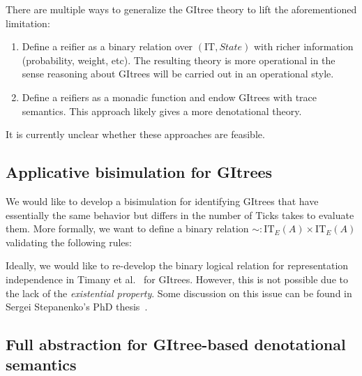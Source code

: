 \documentclass{article}
\theoremstyle{definition}
\theoremstyle{plain}
\theoremstyle{remark}
\newcommand{\IT}{\mathrm{IT}}
\newcommand{\gVis}{\mathrm{Vis}}
\newcommand{\gFun}{\mathrm{Fun}}
\newcommand{\Tick}{\mathrm{Tick}}
\begin{document}
There are multiple ways to generalize the GItree theory to lift the aforementioned limitation:

\begin{enumerate}
  \item Define a reifier as a binary relation over \((\IT,State)\) with richer information (probability, weight, etc).
    The resulting theory is more operational in the sense reasoning about GItrees will be carried out in an operational style.
  \item Define a reifiers as a monadic function and endow GItrees with trace semantics.
    This approach likely gives a more denotational theory.
\end{enumerate}

It is currently unclear whether these approaches are feasible.

\subsection{Applicative bisimulation for GItrees}

We would like to develop a bisimulation for identifying GItrees that have essentially the same behavior but differs in the number of \(\Tick\)s takes to evaluate them.
More formally, we want to define a binary relation \(\sim : \IT_{E}(A) \times \IT_{E}(A)\) validating the following rules:


Ideally, we would like to re-develop the binary logical relation for representation independence in Timany et al.~\cite{jacm-logrel} for GItrees.
However, this is not possible due to the lack of the \emph{existential property}. Some discussion on this issue can be found in Sergei Stepanenko's PhD thesis~\cite{stepanenko2025formal}.

\subsection{Full abstraction for GItree-based denotational semantics}
\end{document}
